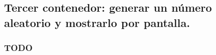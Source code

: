 

\subsection{Tercer contenedor: generar un número aleatorio y mostrarlo por pantalla.}

\subsubsection{TODO}

\begin{listing}[style=consola]
    $ 
\end{listing}